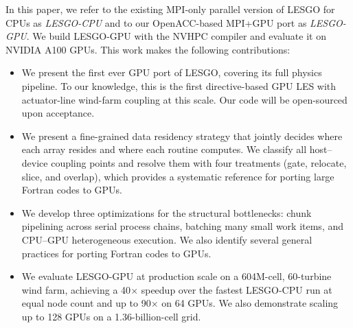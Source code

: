 In this paper, we refer to the existing MPI-only parallel version of LESGO for CPUs as
\emph{LESGO-CPU} and to our OpenACC-based MPI+GPU port as
\emph{LESGO-GPU}. We build \mbox{LESGO-GPU} with the NVHPC compiler
and evaluate it on NVIDIA A100 GPUs. 
This work makes the following contributions:
\begin{itemize}
\item We present the first ever GPU port of LESGO, covering its full
physics pipeline. To our knowledge, this is the first directive-based 
GPU LES with actuator-line wind-farm coupling at this scale. Our code 
will be open-sourced upon acceptance.
\item We present a fine-grained data residency strategy that jointly
decides where each array resides and where each routine computes. We
classify all host--device coupling points and resolve them
with four treatments (gate, relocate, slice, and overlap),
which provides a systematic reference for porting large Fortran
codes to GPUs.
\item We develop three optimizations for the structural bottlenecks:
chunk pipelining across serial process chains, batching many small
work items, and CPU--GPU heterogeneous execution. We also identify
several general practices for porting Fortran codes to GPUs.
\item We evaluate LESGO-GPU at production scale on a 604M-cell, 60-turbine 
wind farm, achieving a 40$\times$ speedup over the fastest LESGO-CPU run at
equal node count and up to 90$\times$ on 64 GPUs.
We also demonstrate scaling up to 128 GPUs on a 1.36-billion-cell grid. 
\end{itemize}
